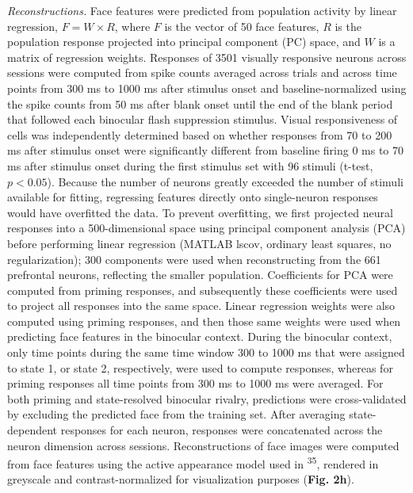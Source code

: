 \documentclass{article}
\begin{document}
\textit{Reconstructions.} Face features were predicted from population activity by linear regression, $F = W \times R$, where $F$ is the vector of 50 face features, $R$ is the population response projected into principal component (PC) space, and $W$ is a matrix of regression weights. Responses of 3501 visually responsive neurons across sessions were computed from spike counts averaged across trials and across time points from 300 ms to 1000 ms after stimulus onset and baseline-normalized using the spike counts from 50 ms after blank onset until the end of the blank period that followed each binocular flash suppression stimulus. Visual responsiveness of cells was independently determined based on whether responses from 70 to 200 ms after stimulus onset were significantly different from baseline firing 0 ms to 70 ms after stimulus onset during the first stimulus set with 96 stimuli (t-test, $p < 0.05$). Because the number of neurons greatly exceeded the number of stimuli available for fitting, regressing features directly onto single-neuron responses would have overfitted the data. To prevent overfitting, we first projected neural responses into a 500-dimensional space using principal component analysis (PCA) before performing linear regression (MATLAB lscov, ordinary least squares, no regularization); 300 components were used when reconstructing from the 661 prefrontal neurons, reflecting the smaller population. Coefficients for PCA were computed from priming responses, and subsequently these coefficients were used to project all responses into the same space. Linear regression weights were also computed using priming responses, and then those same weights were used when predicting face features in the binocular context. During the binocular context, only time points during the same time window 300 to 1000 ms that were assigned to state 1, or state 2, respectively, were used to compute responses, whereas for priming responses all time points from 300 ms to 1000 ms were averaged. For both priming and state-resolved binocular rivalry, predictions were cross-validated by excluding the predicted face from the training set. After averaging state-dependent responses for each neuron, responses were concatenated across the neuron dimension across sessions. Reconstructions of face images were computed from face features using the active appearance model used in \textsuperscript{35}, rendered in greyscale and contrast-normalized for visualization purposes (\textbf{Fig. 2h}).
\end{document}

